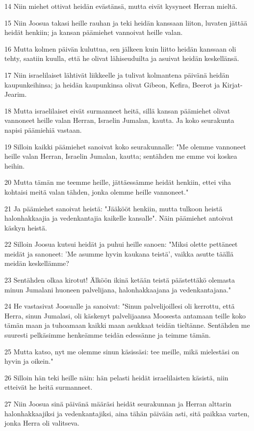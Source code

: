 \par 14 Niin miehet ottivat heidän evästänsä, mutta eivät kysyneet Herran mieltä.
\par 15 Niin Joosua takasi heille rauhan ja teki heidän kanssaan liiton, luvaten jättää heidät henkiin; ja kansan päämiehet vannoivat heille valan.
\par 16 Mutta kolmen päivän kuluttua, sen jälkeen kuin liitto heidän kanssaan oli tehty, saatiin kuulla, että he olivat lähiseuduilta ja asuivat heidän keskellänsä.
\par 17 Niin israelilaiset lähtivät liikkeelle ja tulivat kolmantena päivänä heidän kaupunkeihinsa; ja heidän kaupunkinsa olivat Gibeon, Kefira, Beerot ja Kirjat-Jearim.
\par 18 Mutta israelilaiset eivät surmanneet heitä, sillä kansan päämiehet olivat vannoneet heille valan Herran, Israelin Jumalan, kautta. Ja koko seurakunta napisi päämiehiä vastaan.
\par 19 Silloin kaikki päämiehet sanoivat koko seurakunnalle: "Me olemme vannoneet heille valan Herran, Israelin Jumalan, kautta; sentähden me emme voi koskea heihin.
\par 20 Mutta tämän me teemme heille, jättäessämme heidät henkiin, ettei viha kohtaisi meitä valan tähden, jonka olemme heille vannoneet."
\par 21 Ja päämiehet sanoivat heistä: "Jääkööt henkiin, mutta tulkoon heistä halonhakkaajia ja vedenkantajia kaikelle kansalle". Näin päämiehet antoivat käskyn heistä.
\par 22 Silloin Joosua kutsui heidät ja puhui heille sanoen: "Miksi olette pettäneet meidät ja sanoneet: 'Me asumme hyvin kaukana teistä', vaikka asutte täällä meidän keskellämme?
\par 23 Sentähden olkaa kirotut! Älköön ikinä ketään teistä päästettäkö olemasta minun Jumalani huoneen palvelijana, halonhakkaajana ja vedenkantajana."
\par 24 He vastasivat Joosualle ja sanoivat: "Sinun palvelijoillesi oli kerrottu, että Herra, sinun Jumalasi, oli käskenyt palvelijaansa Moosesta antamaan teille koko tämän maan ja tuhoamaan kaikki maan asukkaat teidän tieltänne. Sentähden me suuresti pelkäsimme henkeämme teidän edessänne ja teimme tämän.
\par 25 Mutta katso, nyt me olemme sinun käsissäsi: tee meille, mikä mielestäsi on hyvin ja oikein."
\par 26 Silloin hän teki heille näin: hän pelasti heidät israelilaisten käsistä, niin etteivät he heitä surmanneet.
\par 27 Niin Joosua sinä päivänä määräsi heidät seurakunnan ja Herran alttarin halonhakkaajiksi ja vedenkantajiksi, aina tähän päivään asti, sitä paikkaa varten, jonka Herra oli valitseva.

